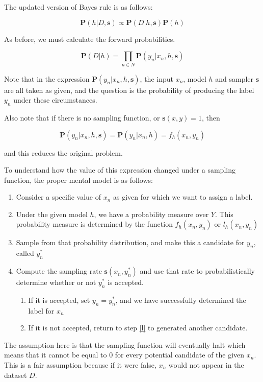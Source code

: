 \documentclass[twoside]{article}
\begin{document}
The updated version of Bayes rule is as follows:

\[\mathbf{P}(h|D,\mathbf{s})\propto\mathbf{P}(D|h,\mathbf{s})\mathbf{P}(h)\]

As before, we must calculate the forward probabilities.

\[\mathbf{P}(D|h)=\prod_{n \in N} \mathbf{P}(y_n|x_n,h,\mathbf{s})\]

Note that in the expression \(\mathbf{P}(y_n|x_n,h,\mathbf{s})\), the input \(x_n\), model \(h\) and sampler \(\mathbf{s}\) are all taken as given, and the question is the probability of producing the label \(y_n\) under these circumstances.

Also note that if there is no sampling function, or \(\mathbf{s}(x,y)=1\), then 

\[\mathbf{P}(y_n|x_n,h,\mathbf{s}) = \mathbf{P}(y_n|x_n,h)=f_h(x_n,y_n)\]

and this reduces the original problem.

To understand how the value of this expression changed under a sampling function, the proper mental model is as follows:

\begin{enumerate}
	\item Consider a specific value of \(x_n\) as given for which we want to assign a label.
	\item Under the given model \(h\), we have a probability measure over \(Y\). This probability measure is determined by the function \(f_h(x_n,y_n)\) or \(l_h(x_n,y_n)\)
	\item \label{l} Sample from that probability distribution, and make this a candidate for \(y_n\), called \(y_n^*\)
	\item Compute the sampling rate \(\mathbf{s}(x_n,y_n^*)\) and use that rate to probabilistically determine whether or not \(y_n^*\) is accepted.
    \begin{enumerate}
    	  \item If it is accepted, set \(y_n=y_n^*\), and we have successfully determined the label for \(x_n\)
        \item If it is not accepted, return to step \ref{l} to generated another candidate.
    \end{enumerate}
\end{enumerate}

The assumption here is that the sampling function will eventually halt which means that it cannot be equal to 0 for every potential candidate of the given \(x_n\). This is a fair assumption because if it were false, \(x_n\) would not appear in the dataset \(D\).
\end{document}
